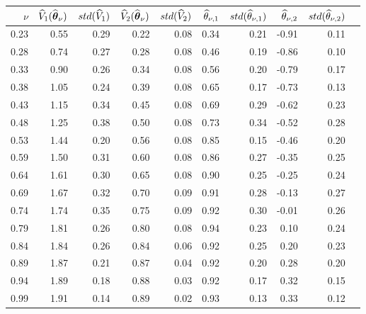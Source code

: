\begin{tabular}{rrrrrrrrrr}\hline 
$\nu$  & $\widehat{V}_1(\widehat{\boldsymbol{\theta}}_{\nu})$ & $std(\widehat{V}_1)$ & $\widehat{V}_2(\widehat{\boldsymbol{\theta}}_{\nu})$ & $std(\widehat{V}_2)$ & $\widehat{\theta}_{\nu,1}$ & $std(\widehat{\theta}_{\nu,1})$ & $\widehat{\theta}_{\nu,2}$ & $std(\widehat{\theta}_{\nu,2})$ \\ \hline 
0.23 &     0.55 &     0.29  &     0.22 &      0.08 &      0.34 &      0.21 &     -0.91 &      0.11 \\ 
0.28 &     0.74 &     0.27  &     0.28 &      0.08 &      0.46 &      0.19 &     -0.86 &      0.10 \\ 
0.33 &     0.90 &     0.26  &     0.34 &      0.08 &      0.56 &      0.20 &     -0.79 &      0.17 \\ 
0.38 &     1.05 &     0.24  &     0.39 &      0.08 &      0.65 &      0.17 &     -0.73 &      0.13 \\ 
0.43 &     1.15 &     0.34  &     0.45 &      0.08 &      0.69 &      0.29 &     -0.62 &      0.23 \\ 
0.48 &     1.25 &     0.38  &     0.50 &      0.08 &      0.73 &      0.34 &     -0.52 &      0.28 \\ 
0.53 &     1.44 &     0.20  &     0.56 &      0.08 &      0.85 &      0.15 &     -0.46 &      0.20 \\ 
0.59 &     1.50 &     0.31  &     0.60 &      0.08 &      0.86 &      0.27 &     -0.35 &      0.25 \\ 
0.64 &     1.61 &     0.30  &     0.65 &      0.08 &      0.90 &      0.25 &     -0.25 &      0.24 \\ 
0.69 &     1.67 &     0.32  &     0.70 &      0.09 &      0.91 &      0.28 &     -0.13 &      0.27 \\ 
0.74 &     1.74 &     0.35  &     0.75 &      0.09 &      0.92 &      0.30 &     -0.01 &      0.26 \\ 
0.79 &     1.81 &     0.26  &     0.80 &      0.08 &      0.94 &      0.23 &      0.10 &      0.24 \\ 
0.84 &     1.84 &     0.26  &     0.84 &      0.06 &      0.92 &      0.25 &      0.20 &      0.23 \\ 
0.89 &     1.87 &     0.21  &     0.87 &      0.04 &      0.92 &      0.20 &      0.28 &      0.20 \\ 
0.94 &     1.89 &     0.18  &     0.88 &      0.03 &      0.92 &      0.17 &      0.32 &      0.15 \\ 
0.99 &     1.91 &     0.14  &     0.89 &      0.02 &      0.93 &      0.13 &      0.33 &      0.12 \\ \hline 
\end{tabular}
